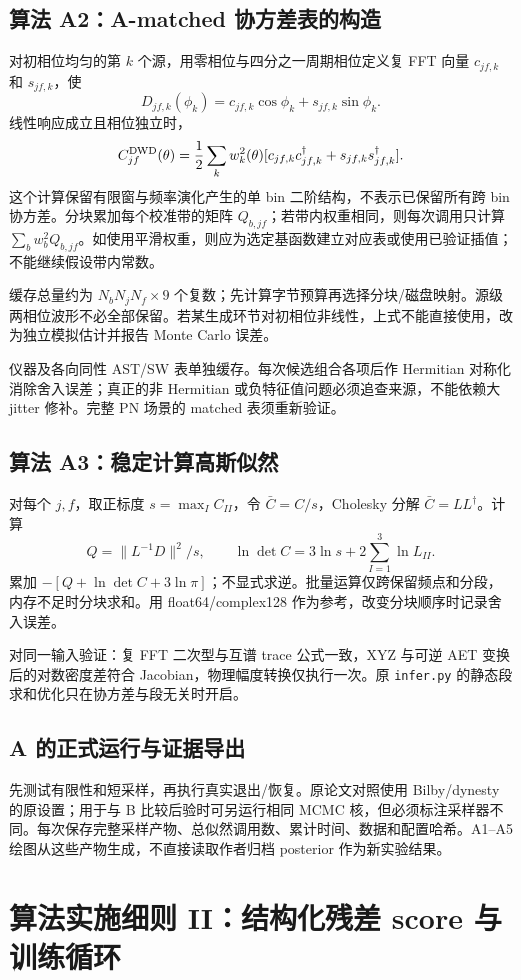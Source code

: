 \documentclass[UTF8,fontset=none,a4paper,11pt]{ctexart}
\newcommand{\chapterpage}[1]{\section{#1}}
\begin{document}
\subsection{算法 A2：A-matched 协方差表的构造}
对初相位均匀的第 $k$ 个源，用零相位与四分之一周期相位定义复 FFT 向量 $c_{jf,k}$ 和 $s_{jf,k}$，使
\begin{equation}
D_{jf,k}(\phi_k)=c_{jf,k}\cos\phi_k+s_{jf,k}\sin\phi_k.
\end{equation}
线性响应成立且相位独立时，
\begin{equation}
C^{\rm DWD}_{jf}(\theta)=\frac12\sum_k w_k^2(\theta)
[c_{jf,k}c_{jf,k}^{\dagger}+s_{jf,k}s_{jf,k}^{\dagger}].
\end{equation}
这个计算保留有限窗与频率演化产生的单 bin 二阶结构，不表示已保留所有跨 bin 协方差。分块累加每个校准带的矩阵 $Q_{b,jf}$；若带内权重相同，则每次调用只计算 $\sum_b w_b^2Q_{b,jf}$。如使用平滑权重，则应为选定基函数建立对应表或使用已验证插值；不能继续假设带内常数。
\par 缓存总量约为 $N_bN_jN_f\times9$ 个复数；先计算字节预算再选择分块/磁盘映射。源级两相位波形不必全部保留。若某生成环节对初相位非线性，上式不能直接使用，改为独立模拟估计并报告 Monte Carlo 误差。
\par 仪器及各向同性 AST/SW 表单独缓存。每次候选组合各项后作 Hermitian 对称化消除舍入误差；真正的非 Hermitian 或负特征值问题必须追查来源，不能依赖大 jitter 修补。完整 PN 场景的 matched 表须重新验证。
\subsection{算法 A3：稳定计算高斯似然}
对每个 $j,f$，取正标度 $s=\max_I C_{II}$，令 $\bar C=C/s$，Cholesky 分解 $\bar C=LL^\dagger$。计算
\begin{equation}
Q=\|L^{-1}D\|^2/s,\qquad
\ln\det C=3\ln s+2\sum_{I=1}^3\ln L_{II}.
\end{equation}
累加 $-[Q+\ln\det C+3\ln\pi]$；不显式求逆。批量运算仅跨保留频点和分段，内存不足时分块求和。用 float64/complex128 作为参考，改变分块顺序时记录舍入误差。
\par 对同一输入验证：复 FFT 二次型与互谱 trace 公式一致，XYZ 与可逆 AET 变换后的对数密度差符合 Jacobian，物理幅度转换仅执行一次。原 \texttt{infer.py} 的静态段求和优化只在协方差与段无关时开启。
\subsection{A 的正式运行与证据导出}
先测试有限性和短采样，再执行真实退出/恢复。原论文对照使用 Bilby/dynesty 的原设置；用于与 B 比较后验时可另运行相同 MCMC 核，但必须标注采样器不同。每次保存完整采样产物、总似然调用数、累计时间、数据和配置哈希。A1--A5 绘图从这些产物生成，不直接读取作者归档 posterior 作为新实验结果。
\chapterpage{算法实施细则 II：结构化残差 score 与训练循环}
\end{document}
